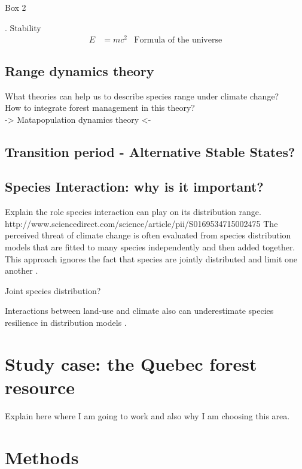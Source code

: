 \begin{tcolorbox}
\hypertarget{box2}{Box 2}. Stability
\begin{align}
E &= mc^2 & \text{Formula of the universe}
\end{align}
\end{tcolorbox}

\subsection*{Range dynamics theory}

What theories can help us to describe species range under climate change?\\
How to integrate forest management in this theory?\\
-> Matapopulation dynamics theory <-

\subsection*{Transition period - Alternative Stable States?}

\subsection*{Species Interaction: why is it important?}
Explain the role species interaction can play on its distribution range.
http://www.sciencedirect.com/science/article/pii/S0169534715002475
The perceived threat of climate change is often evaluated from species distribution models that are fitted to many species independently and then added together. This approach ignores the fact that species are jointly distributed and limit one another \citep{clark2014}.

Joint species distribution?

Interactions between land-use and climate also can underestimate species resilience in distribution models \citep{Goring2017}.

\section{Study case: the Quebec forest resource}

Explain here where I am going to work and also why I am choosing this area.

\section{Methods}


